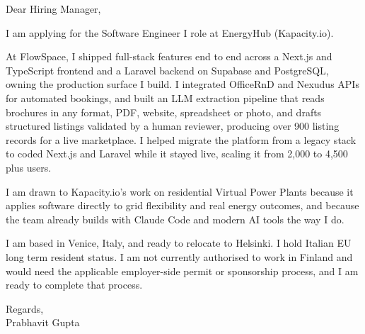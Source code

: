 \documentclass[a4paper,11pt]{article}
\begin{document}
Dear Hiring Manager,

I am applying for the Software Engineer I role at EnergyHub (Kapacity.io).

At FlowSpace, I shipped full-stack features end to end across a Next.js and TypeScript frontend and a Laravel backend on Supabase and PostgreSQL, owning the production surface I build. I integrated OfficeRnD and Nexudus APIs for automated bookings, and built an LLM extraction pipeline that reads brochures in any format, PDF, website, spreadsheet or photo, and drafts structured listings validated by a human reviewer, producing over 900 listing records for a live marketplace. I helped migrate the platform from a legacy stack to coded Next.js and Laravel while it stayed live, scaling it from 2,000 to 4,500 plus users.

I am drawn to Kapacity.io's work on residential Virtual Power Plants because it applies software directly to grid flexibility and real energy outcomes, and because the team already builds with Claude Code and modern AI tools the way I do.

I am based in Venice, Italy, and ready to relocate to Helsinki. I hold Italian EU long term resident status. I am not currently authorised to work in Finland and would need the applicable employer-side permit or sponsorship process, and I am ready to complete that process.

Regards,\\
Prabhavit Gupta
\end{document}
